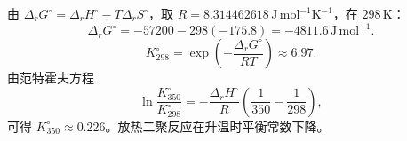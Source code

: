 由 $\Delta_rG^\circ=\Delta_rH^\circ-T\Delta_rS^\circ$，取 $R=8.314462618\,\mathrm{J\,mol^{-1}K^{-1}}$，在 $298\,\mathrm K$：
\[\Delta_rG^\circ=-57200-298(-175.8)=-4811.6\,\mathrm{J\,mol^{-1}}.\]
\[K^\circ_{298}=\exp\!\left(-\frac{\Delta_rG^\circ}{RT}\right)\approx6.97.\]
由范特霍夫方程
\[\ln\frac{K^\circ_{350}}{K^\circ_{298}}=-\frac{\Delta_rH^\circ}{R}\left(\frac1{350}-\frac1{298}\right),\]
可得 $K^\circ_{350}\approx0.226$。放热二聚反应在升温时平衡常数下降。
